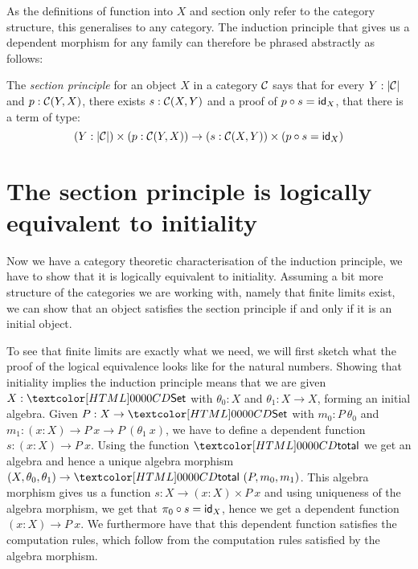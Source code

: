 As the definitions of function into $X$ and section only refer to the
category structure, this generalises to any category. The induction
principle that gives us a dependent morphism for any family can
therefore be phrased abstractly as follows:

\begin{definition}
  The \emph{section principle} for an object $X$ in a category $\mathcal{C}$
  says that for every $Y : | \mathcal{C} |$ and $p : \mathcal{C}(Y,X)$, there exists
  $s : \mathcal{C}(X,Y)$ and a proof of $p \circ s = \id_X$, \ie that there is
  a term of type:
  \[
    (Y : | \Cc |) \times (p : \Cc(Y,X)) \to (s : \Cc(X,Y)) \times (p \circ s = \id_X)
  \]
\end{definition}

\section{The section principle is logically equivalent to initiality}

Now we have a category theoretic characterisation of the induction
principle, we have to show that it is logically equivalent to
initiality. Assuming a bit more structure of the categories we are
working with, namely that finite limits exist, we can show that an
object satisfies the section principle if and only if it is an initial
object.

To see that finite limits are exactly what we need, we will first
sketch what the proof of the logical equivalence looks like for the
natural numbers. Showing that initiality implies the induction
principle means that we are given $X : \Set$ with $\theta_0 : X$ and
$\theta_1 : X \to X$, forming an initial algebra. Given
$P : X \to \Set$ with $m_0 : P\ \theta_0$ and
$m_1 : (x : X) \to P\ x \to P\ (\theta_1\ x)$, we have to define a
dependent function $s : (x : X) \to P\ x$. Using the function $\total$
we get an algebra and hence a unique algebra morphism
$(X,\theta_0,\theta_1) \to \total\ (P,m_0,m_1)$. This algebra morphism
gives us a function $s : X \to (x : X) \times P\ x$ and using
uniqueness of the algebra morphism, we get that
$\pi_0 \circ s = \id_X$, hence we get a dependent function
$(x : X) \to P\ x$. We furthermore have that this dependent function
satisfies the computation rules, which follow from the computation
rules satisfied by the algebra morphism.

